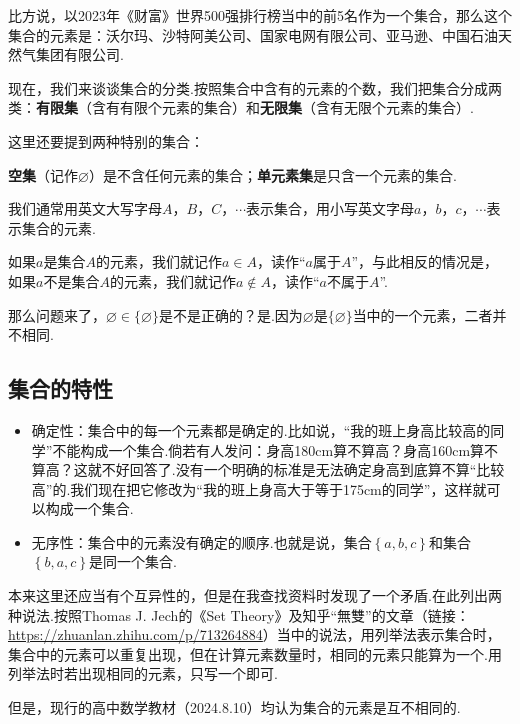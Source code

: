 \documentclass[lang=cn,math=cm,chinesefont=nofont,11pt,scheme=chinese,twocol]{elegantbook}
\begin{document}
比方说，以2023年《财富》世界500强排行榜当中的前5名作为一个集合，那么这个集合的元素是：沃尔玛、沙特阿美公司、国家电网有限公司、亚马逊、中国石油天然气集团有限公司.

现在，我们来谈谈集合的分类.按照集合中含有的元素的个数，我们把集合分成两类：\textbf{有限集}（含有有限个元素的集合）和\textbf{无限集}（含有无限个元素的集合）.

这里还要提到两种特别的集合：

\textbf{空集}（记作$\varnothing$）是不含任何元素的集合；\textbf{单元素集}是只含一个元素的集合.

\hspace*{\fill}

我们通常用英文大写字母$A$，$B$，$C$，$\cdots$表示集合，用小写英文字母$a$，$b$，$c$，$\cdots$表示集合的元素.

如果$a$是集合$A$的元素，我们就记作$a\in A$，读作“$a$属于$A$”，与此相反的情况是，如果$a$不是集合$A$的元素，我们就记作$a\notin A$，读作“$a$不属于$A$”.

那么问题来了，$\varnothing \in \{\varnothing\}$是不是正确的？是.因为$\varnothing$是$\{\varnothing\}$当中的一个元素，二者并不相同.

\subsection{集合的特性}

\begin{itemize}
  \item 确定性：集合中的每一个元素都是确定的.比如说，“我的班上身高比较高的同学”不能构成一个集合.倘若有人发问：身高180cm算不算高？身高160cm算不算高？这就不好回答了.没有一个明确的标准是无法确定身高到底算不算“比较高”的.我们现在把它修改为“我的班上身高大于等于175cm的同学”，这样就可以构成一个集合.
  
  \item 无序性：集合中的元素没有确定的顺序.也就是说，集合$\left\{a,b,c \right\}$和集合$\left\{b,a,c \right\}$是同一个集合.
\end{itemize}

本来这里还应当有个互异性的，但是在我查找资料时发现了一个矛盾.在此列出两种说法.按照Thomas J. Jech的《Set Theory》及知乎“無雙”的文章（链接：\href{https://zhuanlan.zhihu.com/p/713264884}{https://zhuanlan.zhihu.com/p/713264884}）当中的说法，用列举法表示集合时，集合中的元素可以重复出现，但在计算元素数量时，相同的元素只能算为一个.用列举法时若出现相同的元素，只写一个即可.

但是，现行的高中数学教材（2024.8.10）均认为集合的元素是互不相同的.
\end{document}
